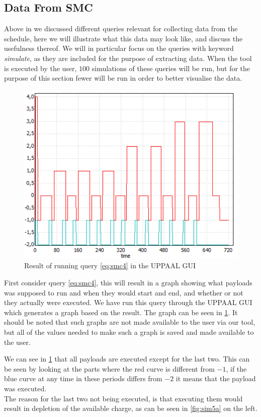 \subsection{Data From SMC}
Above in  we discussed different queries relevant for collecting data from the schedule, here we will illustrate what this data may look like, and discuss the usefulness thereof.
We will in particular focus on the queries with keyword \textit{simulate}, as they are included for the purpose of extracting data.
When the tool is executed by the user, $100$ simulations of these queries will be run, but for the purpose of this section fewer will be run in order to better visualise the data. 

\begin{figure}[h]
	\centering
	\includegraphics[scale=0.8]{graphics/active_running.png}
	\caption{Result of running query \ref{eq:smc4} in the UPPAAL GUI}
	\label{fig:active_running}
\end{figure}
First consider query \ref{eq:smc4}, this will result in a graph showing what payloads was supposed to run and when they would start and end, and whether or not they actually were executed.
We have run this query through the UPPAAL GUI which generates a graph based on the result. 
The graph can be seen in \cref{fig:active_running}.
It should be noted that such graphs are not made available to the user via our tool, but all of the values needed to make such a graph is saved and made available to the user.

We can see in \cref{fig:active_running} that all payloads are executed except for the last two.
This can be seen by looking at the parts where the red curve is different from $-1$, if the blue curve at any time in these periods differs from $-2$ it means that the payload was executed.\\
The reason for the last two not being executed, is that executing them would result in depletion of the available charge, as can be seen in \cref{fig:sim5a} on the left. 

